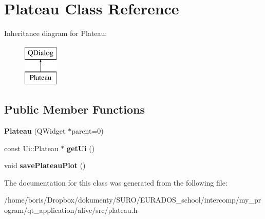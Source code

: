 \hypertarget{classPlateau}{\section{Plateau Class Reference}
\label{classPlateau}
}
Inheritance diagram for Plateau\-:\begin{figure}[H]
\begin{center}
\leavevmode
\includegraphics[height=2.000000cm]{classPlateau}
\end{center}
\end{figure}
\subsection*{Public Member Functions}
\begin{DoxyCompactItemize}
\item 
\hypertarget{classPlateau_a6da1eaad5e515d26fb11844fd8960c28}{{\bfseries Plateau} (Q\-Widget $\ast$parent=0)}\label{classPlateau_a6da1eaad5e515d26fb11844fd8960c28}

\item 
\hypertarget{classPlateau_afbf5a339d15b7916989617e04504986d}{const Ui\-::\-Plateau $\ast$ {\bfseries get\-Ui} ()}\label{classPlateau_afbf5a339d15b7916989617e04504986d}

\item 
\hypertarget{classPlateau_a8dd026299ed1c5ee5d516129baeb8bf2}{void {\bfseries save\-Plateau\-Plot} ()}\label{classPlateau_a8dd026299ed1c5ee5d516129baeb8bf2}

\end{DoxyCompactItemize}


The documentation for this class was generated from the following file\-:\begin{DoxyCompactItemize}
\item 
/home/boris/\-Dropbox/dokumenty/\-S\-U\-R\-O/\-E\-U\-R\-A\-D\-O\-S\-\_\-school/intercomp/my\-\_\-program/qt\-\_\-application/alive/src/plateau.\-h\end{DoxyCompactItemize}
